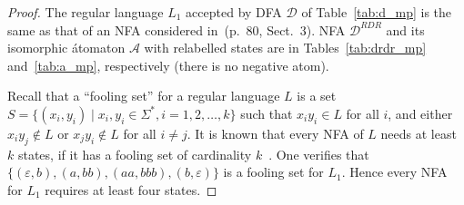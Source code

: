 \documentclass[preprint,12pt]{elsarticle}
\newcommand{\eps}{\varepsilon}
\newcommand{\Sig}{\Sigma}
\newcommand{\cA}{{\mathcal A}}
\newcommand{\cD}{{\mathcal D}}
\newcommand{\rev}{R}
\newcommand{\deter}{D}
\begin{document}
\begin{proof}
\vskip-0.1cm
The regular language $L_1$ accepted by DFA $\cD$ of Table~\ref{tab:d_mp}  
is the same as that of an NFA considered in~\cite{MaPo95}(p.~80, Sect.~3). 
NFA $\cD^{\rev\deter\rev}$ and its isomorphic \'atomaton $\cA$ 
with relabelled states are in Tables~\ref{tab:drdr_mp} and~\ref{tab:a_mp}, 
respectively (there is no negative atom). 

Recall that a ``fooling set'' for a regular language $L$ is a set $S=\{(x_i,y_i)\mid x_i,y_i\in\Sig^*, i=1,2,\dots,k \}$ such that $x_iy_i\in L$ for all $i$, and either $x_iy_j\not\in L$ or $x_jy_i\not\in L$ for all $i\neq j$. It is known that every NFA of $L$ needs at least $k$ states, if it has a fooling set of cardinality $k$~\cite{Bir92}.
One verifies that $\{(\eps,b), (a,bb), (aa,bbb), (b,\eps)\}$ is a fooling set for $L_1$. 
Hence every NFA for $L_1$ requires at least four states.


\end{proof}
\end{document}
